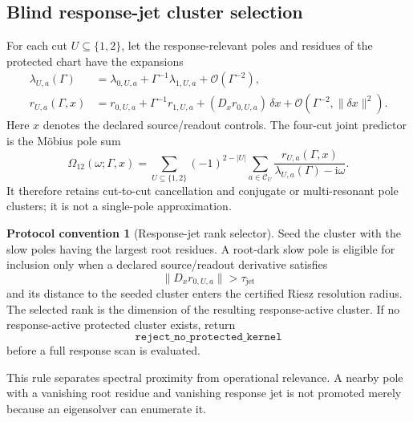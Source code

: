 \documentclass[11pt]{article}
\theoremstyle{definition}
\newtheorem{protocol}[theorem]{Protocol convention}
\theoremstyle{remark}
\newcommand{\ii}{\mathrm i}
\newcommand{\cC}{\mathcal C}
\begin{document}
\subsection{Blind response-jet cluster selection}

For each cut $U\subseteq\{1,2\}$, let the response-relevant poles and residues of the protected chart have the expansions
\begin{align}
 \lambda_{U,a}(\Gamma)
 &=\lambda_{0,U,a}+\Gamma^{-1}\lambda_{1,U,a}
   +\mathcal O(\Gamma^{-2}),
 \label{eq:pole-jet}\\
 r_{U,a}(\Gamma,x)
 &=r_{0,U,a}+\Gamma^{-1}r_{1,U,a}
   +(D_xr_{0,U,a})\,\delta x
   +\mathcal O(\Gamma^{-2},\|\delta x\|^2).
 \label{eq:residue-jet}
\end{align}
Here $x$ denotes the declared source/readout controls.  The four-cut joint predictor is the M\"obius pole sum
\begin{equation}
 \widehat\Omega_{12}(\omega;\Gamma,x)
 =\sum_{U\subseteq\{1,2\}}(-1)^{2-|U|}
   \sum_{a\in\cC_U}
   \frac{r_{U,a}(\Gamma,x)}{\lambda_{U,a}(\Gamma)-\ii\omega}.
 \label{eq:schur-mobius-pole-sum}
\end{equation}
It therefore retains cut-to-cut cancellation and conjugate or multi-resonant pole clusters; it is not a single-pole approximation.

\begin{protocol}[Response-jet rank selector]\label{prot:jet-rank-selector}
Seed the cluster with the slow poles having the largest root residues.  A root-dark slow pole is eligible for inclusion only when a declared source/readout derivative satisfies
\begin{equation}
 \|D_xr_{0,U,a}\|>\tau_{\mathrm{jet}}
 \label{eq:jet-activity}
\end{equation}
and its distance to the seeded cluster enters the certified Riesz resolution radius.  The selected rank is the dimension of the resulting response-active cluster.  If no response-active protected cluster exists, return
\begin{equation}
 \texttt{reject\_no\_protected\_kernel}
 \label{eq:no-kernel-reject}
\end{equation}
before a full response scan is evaluated.
\end{protocol}

This rule separates spectral proximity from operational relevance.  A nearby pole with a vanishing root residue and vanishing response jet is not promoted merely because an eigensolver can enumerate it.
\end{document}
